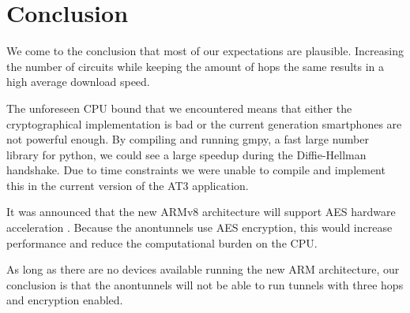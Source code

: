 \section{Conclusion}
\label{sec:experiments:conclusion}
	We come to the conclusion that most of our expectations are plausible. Increasing the number of circuits while keeping the amount of hops the same results in a high average download speed. %
	
	The unforeseen CPU bound that we encountered means that either the cryptographical implementation is bad or the current generation smartphones are not powerful enough. By compiling and running gmpy, a fast large number library for python, we could see a large speedup during the Diffie-Hellman handshake. Due to time constraints we were unable to compile and implement this in the current version of the AT3 application.
	
	It was announced that the new ARMv8 architecture will support AES hardware acceleration \cite{armv8anouncement}. Because the anontunnels use AES encryption, this would increase performance and reduce the computational burden on the CPU. %
	
	As long as there are no devices available running the new ARM architecture, our conclusion is that the anontunnels will not be able to run tunnels with three hops and encryption enabled.